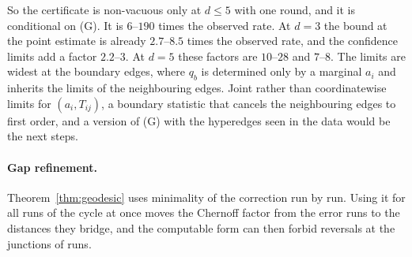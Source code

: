 So the certificate is non-vacuous only at $d\le5$ with one round, and it is conditional on (G). It is $6$--$190$ times the observed rate. At $d=3$ the bound at the point estimate is already $2.7$--$8.5$ times the observed rate, and the confidence limits add a factor $2.2$--$3$. At $d=5$ these factors are $10$--$28$ and $7$--$8$. The limits are widest at the boundary edges, where $q_b$ is determined only by a marginal $a_i$ and inherits the limits of the neighbouring edges. Joint rather than coordinatewise limits for $(a_i,T_{ij})$, a boundary statistic that cancels the neighbouring edges to first order, and a version of (G) with the hyperedges seen in the data would be the next steps.

\paragraph*{Gap refinement.} Theorem~\ref{thm:geodesic} uses minimality of the correction run by run. Using it for all runs of the cycle at once moves the Chernoff factor from the error runs to the distances they bridge, and the computable form can then forbid reversals at the junctions of runs.

